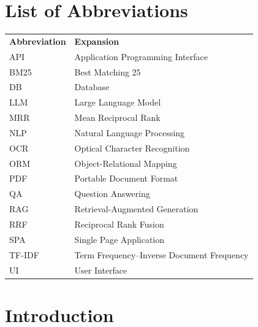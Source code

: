 \documentclass[12pt,a4paper]{report}
\begin{document}
\chapter*{List of Abbreviations}

\begin{longtable}{ll}
\textbf{Abbreviation} & \textbf{Expansion} \\[0.3cm]
API   & Application Programming Interface \\
BM25  & Best Matching 25 \\
DB    & Database \\
LLM   & Large Language Model \\
MRR   & Mean Reciprocal Rank \\
NLP   & Natural Language Processing \\
OCR   & Optical Character Recognition \\
ORM   & Object-Relational Mapping \\
PDF   & Portable Document Format \\
QA    & Question Answering \\
RAG   & Retrieval-Augmented Generation \\
RRF   & Reciprocal Rank Fusion \\
SPA   & Single Page Application \\
TF-IDF & Term Frequency–Inverse Document Frequency \\
UI    & User Interface \\
\end{longtable}

\newpage

\setcounter{page}{1}

\chapter{Introduction}
\end{document}
